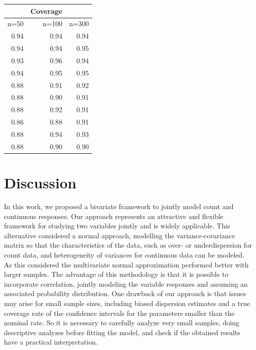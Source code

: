 \documentclass[useAMS,referee]{biom}
\begin{document}
\begin{table}[!h]
\begin{minipage}[b]{.1\textwidth}
\begin{tabular}{rrr} 
	& \multicolumn{1}{c}{Coverage} &  \\ 
	\hline
	n=50 & n=100 & n=300   \\ 	
	\hline 
	0.94&	0.94&	0.94\\
	0.94&	0.94&	0.95\\
	0.93&	0.96&	0.94\\
	0.94&	0.95&	0.95\\
	0.88&	0.91&	0.92\\
	0.88&	0.90&	0.91\\
	0.88&	0.92&	0.91\\
	0.86&	0.88&	0.91\\
	0.88&	0.94&	0.93\\
	0.88&	0.90&	0.90\\	
	\hline
\end{tabular}
\end{minipage}
\end{table}












\section{Discussion}
\label{s:discuss}

In this work, we proposed a bivariate framework to jointly model count and continuous responses.
Our approach represents an attractive and flexible framework for studying two variables jointly and is widely applicable.
This alternative considered a normal approach, modelling the variance-covariance matrix so that the characteristics of the data, such as over- or underdispersion for count data, and heterogeneity of variances for continuous data can be modeled. As this considered the multivariate normal approximation performed better with larger samples. The advantage of this methodology is that it is possible to incorporate correlation, jointly modeling the variable responses and assuming an associated probability distribution. One drawback of our approach is that issues may arise for small sample sizes, including biased dispersion estimates and a true coverage rate of the confidence intervals for the parameters smaller than the nominal rate. So it is necessary to carefully analyze very small samples, doing descriptive analyzes before fitting the model, and check if the obtained results have a practical interpretation.
\end{document}
